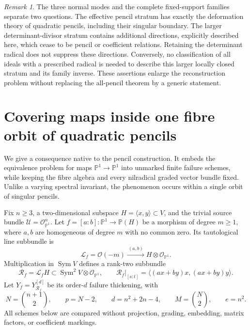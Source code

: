 \documentclass[11pt,reqno]{amsart}
\numberwithin{equation}{section}
\theoremstyle{definition}\newtheorem{definition}[theorem]{Definition}
\theoremstyle{remark}\newtheorem{remark}[theorem]{Remark}
\newcommand{\Pj}{\mathbb P}\newcommand{\A}{\mathbb A}
\newcommand{\OO}{\mathcal O}\newcommand{\II}{\mathcal I}
\DeclareMathOperator{\Sym}{Sym}\DeclareMathOperator{\Gr}{Gr}
\begin{document}
\begin{remark}\label{rem:scope-transverse}
The three normal modes and the complete fixed-support families
separate two questions.  The effective pencil stratum has exactly
the deformation theory of quadratic pencils, including their
singular boundary.  The larger determinant-divisor stratum contains
additional directions, explicitly described here, which cease to
be pencil or coefficient relations.  Retaining the determinant
radical does not suppress these directions.  Conversely, no
classification of all ideals with a prescribed radical is needed
to describe this larger locally closed stratum and its family
inverse.  These assertions enlarge the reconstruction problem
without replacing the all-pencil theorem by a generic statement.
\end{remark}

\section{Covering maps inside one fibre orbit of quadratic pencils}
\label{sec:covering-moduli-v148}

We give a consequence native to the pencil construction.  It embeds
the equivalence problem for maps \(\Pj^1\to\Pj^1\) into
unmarked finite failure schemes, while keeping the fibre algebra
and every nilradical graded vector bundle fixed.  Unlike a varying
spectral invariant, the phenomenon occurs within a single orbit
of singular pencils.

Fix \(n\ge3\), a two-dimensional subspace
\(H=\langle x,y\rangle\subset V\), and the trivial source
bundle \(\mathcal U=\OO_{\Pj^1}^n\).  Let
\(f=[a:b]:\Pj^1\to\Pj(H)\) be a morphism of degree
\(m\ge1\), where \(a,b\) are homogeneous of degree \(m\)
with no common zero.  Its tautological line subbundle is
\[
 \mathcal L_f=\OO(-m)
       \xrightarrow{\ (a,b)\ }H\otimes\OO_{\Pj^1}.
\]
Multiplication in \(\Sym V\) defines a rank-two subbundle
\begin{equation}\label{eq:cover-pencil-v148}
 \mathcal R_f=\mathcal L_f H
       \subset\Sym^2V\otimes\OO_{\Pj^1},
 \qquad
 \mathcal R_f|_{[s:t]}=
   \langle (ax+by)x,(ax+by)y\rangle.
\end{equation}
Let \(Y_f=Y_{\mathcal R_f}^{[d]}\) be its order-\(d\)
failure thickening, with
\[
 N=\binom{n+1}{2},\qquad p=N-2,\qquad
 d=n^2+2n-4,\qquad M=\binom N2,\qquad e=n^2.
\]
All schemes below are compared without projection, grading,
embedding, matrix factors, or coefficient markings.
\end{document}
